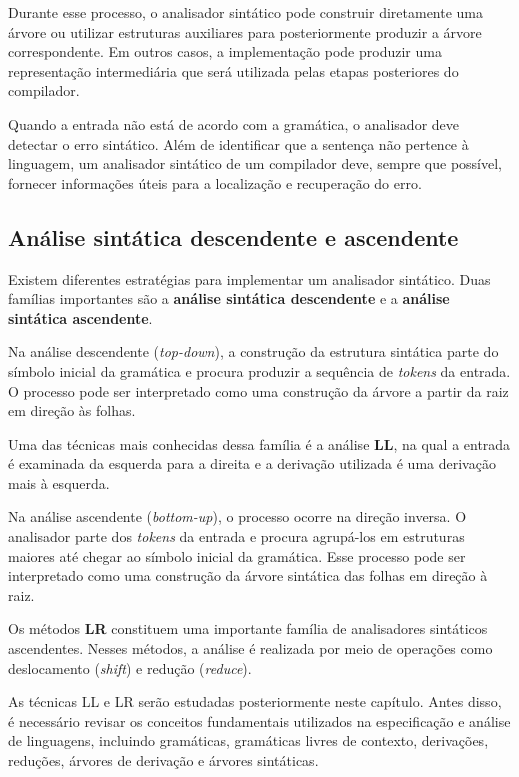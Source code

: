 \documentclass[
  brazilian,
  letterpaper,
]{book}
\theoremstyle{plain}
\theoremstyle{definition}
\theoremstyle{remark}
\begin{document}
Durante esse processo, o analisador sintático pode construir diretamente
uma árvore ou utilizar estruturas auxiliares para posteriormente
produzir a árvore correspondente. Em outros casos, a implementação pode
produzir uma representação intermediária que será utilizada pelas etapas
posteriores do compilador.

Quando a entrada não está de acordo com a gramática, o analisador deve
detectar o erro sintático. Além de identificar que a sentença não
pertence à linguagem, um analisador sintático de um compilador deve,
sempre que possível, fornecer informações úteis para a localização e
recuperação do erro.

\subsection{Análise sintática descendente e
ascendente}\label{anuxe1lise-sintuxe1tica-descendente-e-ascendente}

Existem diferentes estratégias para implementar um analisador sintático.
Duas famílias importantes são a \textbf{análise sintática descendente} e
a \textbf{análise sintática ascendente}.

Na análise descendente (\emph{top-down}), a construção da estrutura
sintática parte do símbolo inicial da gramática e procura produzir a
sequência de \emph{tokens} da entrada. O processo pode ser interpretado
como uma construção da árvore a partir da raiz em direção às folhas.

Uma das técnicas mais conhecidas dessa família é a análise \textbf{LL},
na qual a entrada é examinada da esquerda para a direita e a derivação
utilizada é uma derivação mais à esquerda.

Na análise ascendente (\emph{bottom-up}), o processo ocorre na direção
inversa. O analisador parte dos \emph{tokens} da entrada e procura
agrupá-los em estruturas maiores até chegar ao símbolo inicial da
gramática. Esse processo pode ser interpretado como uma construção da
árvore sintática das folhas em direção à raiz.

Os métodos \textbf{LR} constituem uma importante família de analisadores
sintáticos ascendentes. Nesses métodos, a análise é realizada por meio
de operações como deslocamento (\emph{shift}) e redução (\emph{reduce}).

As técnicas LL e LR serão estudadas posteriormente neste capítulo. Antes
disso, é necessário revisar os conceitos fundamentais utilizados na
especificação e análise de linguagens, incluindo gramáticas, gramáticas
livres de contexto, derivações, reduções, árvores de derivação e árvores
sintáticas.
\end{document}
